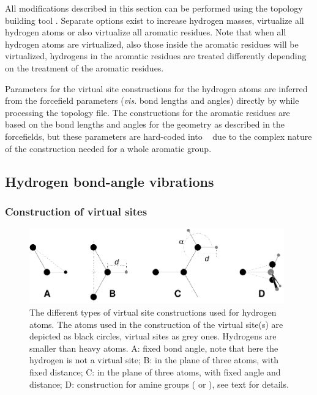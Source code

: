 All modifications described in this section can be performed using the
{\gromacs} topology building tool {\tt {}}. Separate
options exist to increase hydrogen masses, virtualize all hydrogen atoms
or also virtualize all aromatic residues. Note that when all hydrogen
atoms are virtualized, also those inside the aromatic residues will be
virtualized, {\ie} hydrogens in the aromatic residues are treated
differently depending on the treatment of the aromatic residues.

Parameters for the virtual site constructions for the hydrogen atoms are
inferred from the forcefield parameters ({\em vis}. bond lengths and
angles) directly by {\tt {}} while processing the
topology file.  The constructions for the aromatic residues are based
on the bond lengths and angles for the geometry as described in the
forcefields, but these parameters are hard-coded into {\tt
{}} due to the complex nature of the construction
needed for a whole aromatic group.

\subsection{Hydrogen bond-angle vibrations}
\label{sec:vsitehydro}
\subsubsection{Construction of virtual sites} %
\begin{figure}
\centerline{\includegraphics[width=11cm]{plots/dumtypes}}
\caption[Virtual site constructions for hydrogen atoms.]{The different
types of virtual site constructions used for hydrogen atoms. The atoms
used in the construction of the virtual site(s) are depicted as black
circles, virtual sites as grey ones. Hydrogens are smaller than heavy
atoms. {\sf A}: fixed bond angle, note that here the hydrogen is not a
virtual site; {\sf B}: in the plane of three atoms, with fixed distance;
{\sf C}: in the plane of three atoms, with fixed angle and distance;
{\sf D}: construction for amine groups ({\amine} or {\aminep}), see
text for details.}
\label{fig:vsitehydro}
\end{figure}

